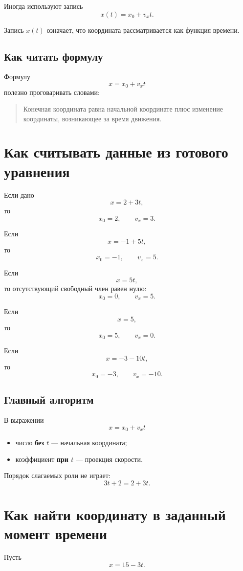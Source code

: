 \documentclass[a4paper,12pt]{article}
\newcommand{\important}[1]{\textbf{#1}}
\begin{document}
Иногда используют запись
\[
x(t)=x_0+v_xt.
\]

Запись \(x(t)\) означает, что координата рассматривается как функция времени.

\subsection{Как читать формулу}

Формулу
\[
x=x_0+v_xt
\]
полезно проговаривать словами:

\begin{quote}
Конечная координата равна начальной координате плюс изменение координаты, возникающее за время движения.
\end{quote}

\section{Как считывать данные из готового уравнения}

Если дано
\[
x=2+3t,
\]
то
\[
x_0=2,\qquad v_x=3.
\]

Если
\[
x=-1+5t,
\]
то
\[
x_0=-1,\qquad v_x=5.
\]

Если
\[
x=5t,
\]
то отсутствующий свободный член равен нулю:
\[
x_0=0,\qquad v_x=5.
\]

Если
\[
x=5,
\]
то
\[
x_0=5,\qquad v_x=0.
\]

Если
\[
x=-3-10t,
\]
то
\[
x_0=-3,\qquad v_x=-10.
\]

\subsection{Главный алгоритм}

В выражении
\[
x=x_0+v_xt
\]

\begin{itemize}
  \item число \important{без \(t\)} --- начальная координата;
  \item коэффициент \important{при \(t\)} --- проекция скорости.
\end{itemize}

Порядок слагаемых роли не играет:
\[
3t+2=2+3t.
\]

\section{Как найти координату в заданный момент времени}

Пусть
\[
x=15-3t.
\]
\end{document}
